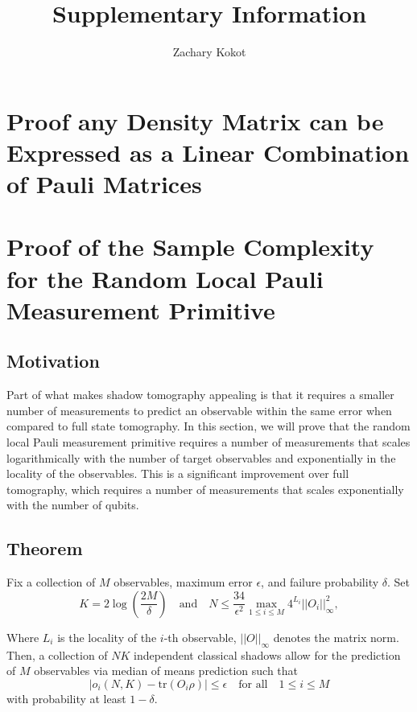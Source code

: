 \documentclass[12pt]{article}
\author{Zachary Kokot}
\title{Supplementary Information}
\begin{document}
    \maketitle

    \tableofcontents

    \newpage

    \section{Proof any Density Matrix can be Expressed as a Linear Combination of Pauli Matrices}

    \section{Proof of the Sample Complexity for the Random Local Pauli Measurement Primitive}

    \subsection{Motivation}
    Part of what makes shadow tomography appealing is that it requires a smaller number of measurements to predict an observable within the same error when compared to full state tomography. In this section, we will prove that the random local Pauli measurement primitive requires a number of measurements that scales logarithmically with the number of target observables and exponentially in the locality of the observables. This is a significant improvement over full tomography, which requires a number of measurements that scales exponentially with the number of qubits.

    \subsection{Theorem}

    Fix a collection of $M$ observables, maximum error $\epsilon$, and failure probability $\delta$. Set 
    \begin{equation*}
        K = 2 \log{\left(\frac{2M}{\delta}\right)} \quad \text{and} \quad N \leq \frac{34}{\epsilon^2} \max_{1 \leq i \leq M} 4^{L_i} ||O_i||^2_\infty,
    \end{equation*}

    Where $L_i$ is the locality of the $i$-th observable, $||O||_\infty$ denotes the matrix norm. Then, a collection of $NK$ independent classical shadows allow for the prediction of $M$ observables via median of means prediction such that
    \begin{equation*}
        |\hat{o}_i(N,K) - \text{tr}(O_i\rho)| \leq \epsilon \quad \text{for all} \quad 1 \leq i \leq M
    \end{equation*}
    with probability at least $1-\delta$.
\end{document}
